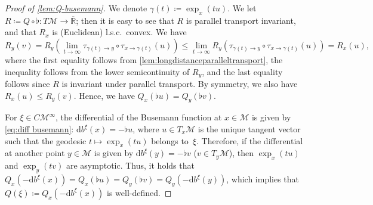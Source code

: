 \documentclass[11pt,letterpaper]{article}
\numberwithin{equation}{section}
\newcommand{\RR}{\mathbb{R}}
\newcommand{\diff}{\mathrm{d}}
\newcommand{\MM}{\mathcal{M}}
\begin{document}
\begin{proof}[Proof of \cref{lem:Q-busemann}]
    We denote $\gamma(t) \coloneqq \exp_x(tu)$.
    We let $R \coloneqq Q \circ \flat\colon T\MM \to \overline{\RR}$;
    then it is easy to see that $R$ is parallel transport invariant, and that $R_x$ is (Euclidean) l.s.c.\ convex.
    We have
    \[
        R_y(v) = R_y\left(\lim_{t \to \infty}\tau_{\gamma(t) \to y}\circ\tau_{x \to \gamma(t)}(u)\right) \le \lim_{t \to \infty}R_y\left(\tau_{\gamma(t) \to y}\circ\tau_{x \to \gamma(t)}(u)\right) = R_x(u),
    \]
    where the first equality follows from \cref{lem:longdistanceparalleltransport}, the inequality follows from the lower semicontinuity of $R_y$, and the last equality follows since $R$ is invariant under parallel transport.
    By symmetry, we also have $R_x(u) \le R_y(v)$.
    Hence, we have $Q_x(\flat u) = Q_y(\flat v)$.

    For $\xi \in C\MM^\infty$, the differential of the Busemann function at $x \in \MM$ is given by \cref{eq:diff busemann}: $\diff b^\xi(x) = -\flat u$, where $u \in T_x\MM$ is the unique tangent vector such that the geodesic $t\mapsto \exp_x(tu)$ belongs to~$\xi$.
    Therefore, if the differential at another point $y \in \MM$ is given by $\diff b^\xi(y) = -\flat v$ ($v \in T_y\MM$), then $\exp_x(tu)$ and $\exp_y(tv)$ are asymptotic.
    Thus, it holds that $Q_x(-\diff b^\xi(x)) = Q_x(\flat u) = Q_y(\flat v) = Q_y(-\diff b^\xi(y))$, which implies that $Q(\xi) \coloneqq Q_x(-\diff b^\xi(x))$ is well-defined.
\end{proof}



\end{document}
